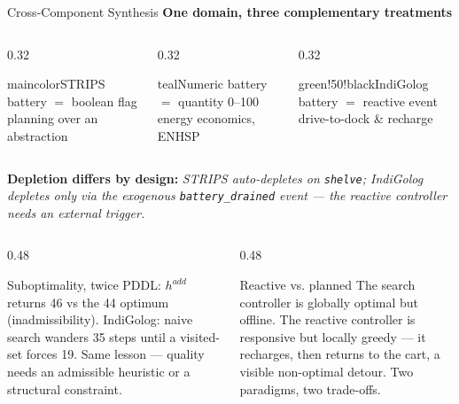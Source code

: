 \documentclass{beamer}
\begin{document}
\begin{frame}{Cross-Component Synthesis}
\small
\textbf{One domain, three complementary treatments}
\vspace{0.1em}
\begin{columns}
\begin{column}{0.32\textwidth}
\begin{colorblock}[white]{maincolor}{STRIPS}
battery $=$ boolean flag\\ {\small planning over an abstraction}
\end{colorblock}
\end{column}
\begin{column}{0.32\textwidth}
\begin{colorblock}[white]{teal}{Numeric}
battery $=$ quantity 0--100\\ {\small energy economics, ENHSP}
\end{colorblock}
\end{column}
\begin{column}{0.32\textwidth}
\begin{colorblock}[white]{green!50!black}{IndiGolog}
battery $=$ reactive event\\ {\small drive-to-dock \& recharge}
\end{colorblock}
\end{column}
\end{columns}

\vspace{0.15em}
{\footnotesize\textbf{\color{maincolor}Depletion differs by design:}
\textit{STRIPS auto-depletes on \texttt{shelve}; IndiGolog depletes only via
the exogenous \texttt{battery\_drained} event --- the reactive controller needs
an external trigger.}}

\vspace{0.1em}
\begin{columns}
\begin{column}{0.48\textwidth}
\begin{block}{Suboptimality, twice}
PDDL: $h^{add}$ returns 46 vs the 44 optimum (inadmissibility). IndiGolog:
naive search wanders 35 steps until a visited-set forces 19. Same lesson ---
quality needs an admissible heuristic or a structural constraint.
\end{block}
\end{column}
\begin{column}{0.48\textwidth}
\begin{block}{Reactive vs. planned}
The search controller is globally optimal but offline. The reactive controller
is responsive but locally greedy --- it recharges, then returns to the cart, a
visible non-optimal detour. Two paradigms, two trade-offs.
\end{block}
\end{column}
\end{columns}
\end{frame}
\end{document}
